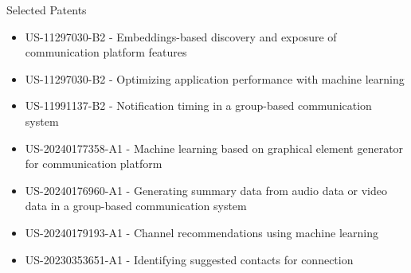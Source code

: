 \documentclass{resume} %
\begin{document}
\begin{rSection}{Selected Patents}
\begin{itemize}
	\item US-11297030-B2 -  Embeddings-based discovery and exposure of communication platform features
	\item US-11297030-B2 - Optimizing application performance with machine learning
	\item US-11991137-B2 - Notification timing in a group-based communication system
	\item US-20240177358-A1 - Machine learning based on graphical element generator for communication platform
	\item US-20240176960-A1 - Generating summary data from audio data or video data in a group-based communication system
	\item US-20240179193-A1 - Channel recommendations using machine learning
	\item US-20230353651-A1 - Identifying suggested contacts for connection
\end{itemize}
\end{rSection}


\end{document}
